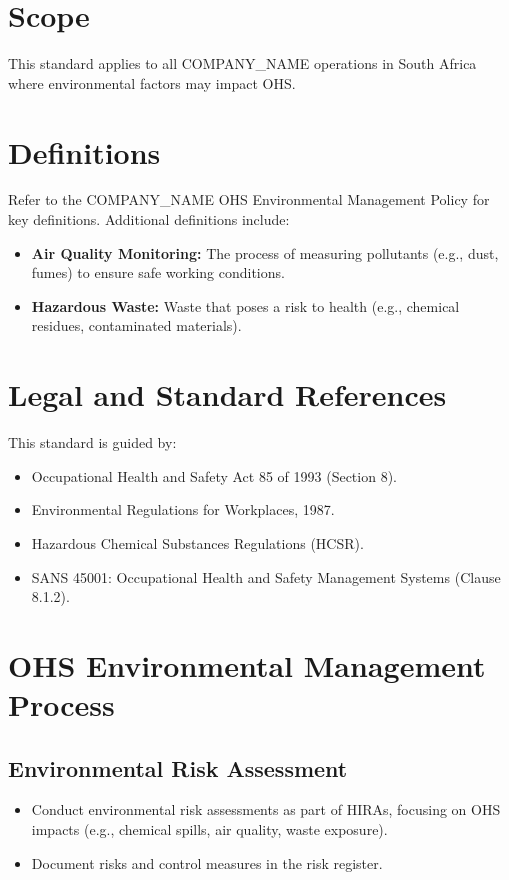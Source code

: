 \documentclass[12pt]{article}
\begin{document}
\section{Scope}
This standard applies to all {{COMPANY_NAME}} operations in South Africa where environmental factors may impact OHS.

\section{Definitions}
Refer to the {{COMPANY_NAME}} OHS Environmental Management Policy for key definitions. Additional definitions include:
\begin{itemize}
    \item \textbf{Air Quality Monitoring:} The process of measuring pollutants (e.g., dust, fumes) to ensure safe working conditions.
    \item \textbf{Hazardous Waste:} Waste that poses a risk to health (e.g., chemical residues, contaminated materials).
\end{itemize}

\section{Legal and Standard References}
This standard is guided by:
\begin{itemize}
    \item Occupational Health and Safety Act 85 of 1993 (Section 8).
    \item Environmental Regulations for Workplaces, 1987.
    \item Hazardous Chemical Substances Regulations (HCSR).
    \item SANS 45001: Occupational Health and Safety Management Systems (Clause 8.1.2).
\end{itemize}

\section{OHS Environmental Management Process}

\subsection{Environmental Risk Assessment}
\begin{itemize}
    \item Conduct environmental risk assessments as part of HIRAs, focusing on OHS impacts (e.g., chemical spills, air quality, waste exposure).
    \item Document risks and control measures in the risk register.
\end{itemize}
\end{document}
